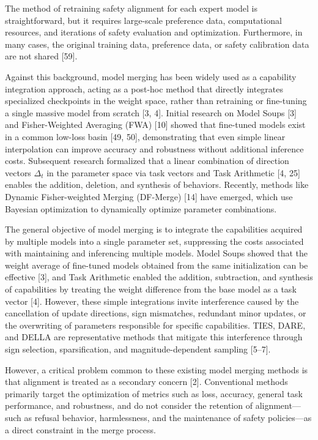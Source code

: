 \documentclass{article}
\begin{document}
The method of retraining safety alignment for each expert model is straightforward, but it requires large-scale preference data, computational resources, and iterations of safety evaluation and optimization. Furthermore, in many cases, the original training data, preference data, or safety calibration data are not shared [59].

Against this background, model merging has been widely used as a capability integration approach, acting as a post-hoc method that directly integrates specialized checkpoints in the weight space, rather than retraining or fine-tuning a single massive model from scratch [3, 4]. Initial research on Model Soups [3] and Fisher-Weighted Averaging (FWA) [10] showed that fine-tuned models exist in a common low-loss basin [49, 50], demonstrating that even simple linear interpolation can improve accuracy and robustness without additional inference costs. Subsequent research formalized that a linear combination of direction vectors $\Delta_t$ in the parameter space via task vectors and Task Arithmetic [4, 25] enables the addition, deletion, and synthesis of behaviors. Recently, methods like Dynamic Fisher-weighted Merging (DF-Merge) [14] have emerged, which use Bayesian optimization to dynamically optimize parameter combinations.

The general objective of model merging is to integrate the capabilities acquired by multiple models into a single parameter set, suppressing the costs associated with maintaining and inferencing multiple models. Model Soups showed that the weight average of fine-tuned models obtained from the same initialization can be effective [3], and Task Arithmetic enabled the addition, subtraction, and synthesis of capabilities by treating the weight difference from the base model as a task vector [4]. However, these simple integrations invite interference caused by the cancellation of update directions, sign mismatches, redundant minor updates, or the overwriting of parameters responsible for specific capabilities. TIES, DARE, and DELLA are representative methods that mitigate this interference through sign selection, sparsification, and magnitude-dependent sampling [5--7].

However, a critical problem common to these existing model merging methods is that alignment is treated as a secondary concern [2]. Conventional methods primarily target the optimization of metrics such as loss, accuracy, general task performance, and robustness, and do not consider the retention of alignment---such as refusal behavior, harmlessness, and the maintenance of safety policies---as a direct constraint in the merge process.
\end{document}
